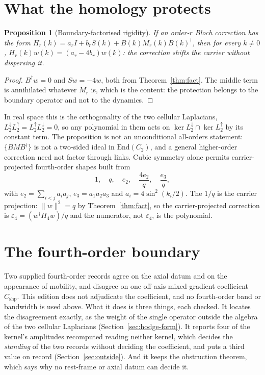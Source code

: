 \documentclass[11pt]{article}
\theoremstyle{plain}
\newtheorem{proposition}[theorem]{Proposition}
\theoremstyle{definition}
\theoremstyle{remark}
\newcommand{\chk}[1]{}
\newcommand{\dg}{^{\dagger}}
\begin{document}
\section{What the homology protects}

\begin{proposition}[Boundary-factorised rigidity]\label{prop:rigid}
If an order-$r$ Bloch correction has the form
$H_r(k)=a_rI+b_rS(k)+B(k)M_r(k)B(k)\dg$, then for every $k\neq0$,
$H_r(k)w(k)=(a_r-4b_r)w(k)$: the correction shifts the carrier without
dispersing it.
\end{proposition}

\begin{proof}
$B\dg w=0$ and $Sw=-4w$, both from Theorem~\ref{thm:fact}. The middle term is
annihilated whatever $M_r$ is, which is the content: the protection belongs to
the boundary operator and not to the dynamics.
\end{proof}
\chk{a boundary-factorised correction shifts the carrier without dispersing it, for generic M}

In real space this is the orthogonality of the two cellular Laplacians,
$L^{\downarrow}_2L^{\uparrow}_2=L^{\uparrow}_2L^{\downarrow}_2=0$, so any
polynomial in them acts on $\ker L^{\downarrow}_2\cap\ker L^{\uparrow}_2$ by
its constant term. The proposition is not an unconditional all-orders
statement: $\{BMB\dg\}$ is not a two-sided ideal in $\mathrm{End}(C_2)$, and a
general higher-order correction need not factor through links. Cubic symmetry
alone permits carrier-projected fourth-order shapes built from
\begin{equation}\label{eq:shapes}
  1,\quad q,\quad e_2,\quad \frac{4e_2}{q},\quad \frac{e_3}{q},
\end{equation}
with $e_2=\sum_{i<j}a_ia_j$, $e_3=a_1a_2a_3$ and $a_i=4\sin^2(k_i/2)$. The
$1/q$ is the carrier projection: $\|w\|^2=q$ by Theorem~\ref{thm:fact}, so the
carrier-projected correction is $\varepsilon_4=(w\dg H_4w)/q$ and the
numerator, not $\varepsilon_4$, is the polynomial.
\chk{the carrier projection is where the 1/q comes from}
\chk{clearing the denominator reproduces the five-element numerator basis}

\section{The fourth-order boundary}
\label{sec:fourth}

Two supplied fourth-order records agree on the axial datum and on the
appearance of mobility, and disagree on one off-axis mixed-gradient
coefficient $C_{\mathrm{shp}}$. This edition does not adjudicate the
coefficient, and no fourth-order band or bandwidth is used above. What it does
is three things, each checked. It locates the disagreement exactly, as the
weight of the single operator outside the algebra of the two cellular
Laplacians (Section~\ref{sec:hodge-form}). It reports four of the kernel's
amplitudes recomputed reading neither kernel, which decides the
\emph{standing} of the two records without deciding the coefficient, and
puts a third value on record (Section~\ref{sec:outside}). And it keeps the
obstruction theorem, which says why no rest-frame or axial datum can decide
it.
\end{document}
